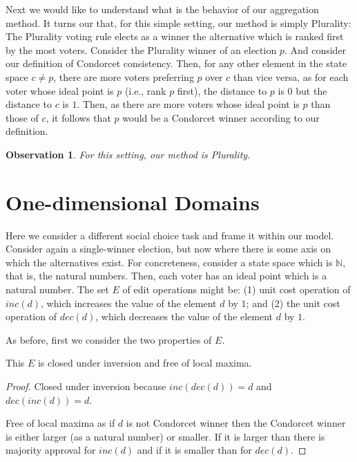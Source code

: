 \documentclass{llncs}
\newtheorem{observation}{Observation}
\begin{document}
Next we would like to understand what is the behavior of our aggregation method. It turns our that, for this simple setting, our method is simply Plurality:
  The Plurality voting rule elects as a winner the alternative which is ranked first by the most voters.
Consider the Plurality winner of an election $p$. And consider our definition of Condorcet consistency. Then, for any other element in the state space $c \neq p$, there are more voters preferring $p$ over $c$ than vice versa, as for each voter whose ideal point is $p$ (i.e., rank $p$ first), the distance to $p$ is $0$ but the distance to $c$ is $1$. Then, as there are more voters whose ideal point is $p$ than those of $c$, it follows that $p$ would be a Condorcet winner according to our definition.

\begin{observation}
  For this setting, our method is Plurality.
\end{observation}


\section{One-dimensional Domains}

Here we consider a different social choice task and frame it within our model. Consider again a single-winner election, but now where there is some axis on which the alternatives exist. For concreteness, consider a state space which is $\mathbb{N}$, that is, the natural numbers. Then, each voter has an ideal point which is a natural number. The set $E$ of edit operations might be:
  (1) unit cost operation of $inc(d)$, which increases the value of the element $d$ by $1$;
  and
  (2) the unit cost operation of $dec(d)$, which decreases the value of the element $d$ by $1$.

As before, first we consider the two properties of $E$.

\begin{lemma}
  This $E$ is closed under inversion and free of local maxima.
\end{lemma}

\begin{proof}
%
Closed under inversion because $inc(dec(d)) = d$ and $dec(inc(d)) = d$.

Free of local maxima as if $d$ is not Condorcet winner then the Condorcet winner is either larger (as a natural number) or smaller. If it is larger than there is majority approval for $inc(d)$ and if it is smaller than for $dec(d)$.
%
\end{proof}
\end{document}
